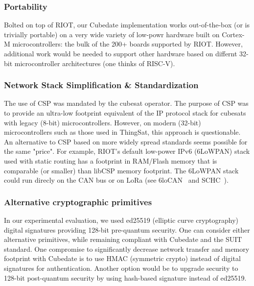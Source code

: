 \subsubsection{Portability} Bolted on top of RIOT, our Cubedate implementation works out-of-the-box (or is trivially portable) on a very wide variety of low-powr hardware built on Cortex-M microcontrollers: the bulk of the 200+ boards supported by RIOT.
However, additional work would be needed to support other hardware based on differnt 32-bit microcontroller architectures (one thinks of RISC-V).

\subsubsection{Network Stack Simplification \& Standardization}
The use of CSP was mandated by the cubesat operator. The purpose of CSP was to provide an ultra-low footprint equivalent of the IP protocol stack for cubesats with legacy (8-bit) microcontrollers.
However, on modern (32-bit) microcontrollers such as those used in ThingSat, this approach is questionable. An alternative to CSP based on more widely spread standards seems possible for the same "price". For example, RIOT's default low-power IPv6 (6LoWPAN) stack used with static routing has a footprint in RAM/Flash memory that is comparable (or smaller) than libCSP memory footprint. The 6LoWPAN stack could run direcly on the CAN bus or on LoRa (see 6loCAN~\cite{wachter20206locan01} and SCHC~\cite{rfc8724}).

\subsubsection{Alternative cryptographic primitives}
In our experimental evaluation, we used ed25519 (elliptic curve cryptography) digital signatures providing 128-bit pre-quantum security. One can consider either alternative primitives, while remaining compliant with Cubedate and the SUIT standard. One compromise to significantly decrease network transfer and memory footprint with Cubedate is to use HMAC (symmetric crypto) instead of digital signatures for authentication. Another option would be to upgrade security to 128-bit post-quantum security by using hash-based signature instead of ed25519.

\iffalse
In fact, taking as base
 CubeSat sub-systems developers the same features as an
TCP/IP stack without the overhead of the IP header, allowing to run on constrained
systems with under 4kB of RAM. Unless running on this kind of very constrained
devices using CSP can be contested. A minimal CoAP server example running on
LibCSP or RIOTs default IPv6/UDP network stack (GNRC) yields similar numbers of RAM/Flash
usage: 10KB\/30KB (CSP) vs 8KB/31KB (GNRC). Optimal compression of an Ipv6 header
can shrink the size from 48B to 4B, comparable to CSP2.0 3B header.
Furthermore  6loCAN\cite{wachter20206locan01}, SCHC\cite{rfc8724}, allow to
optimize IPv6 for CAN-BUS or LoRa network. What is gained in simplicity is eventually
lost by using a not standard network stack, i.e. using standard application
layer protocols.
\fi

